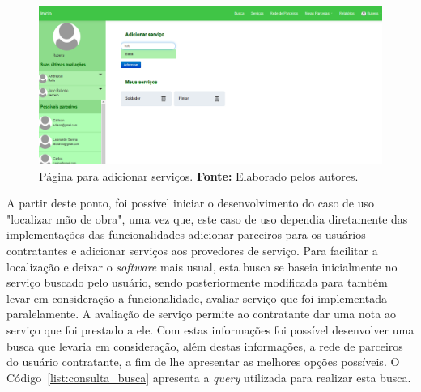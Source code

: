 \newpage
\begin{figure}[h!]
	\centerline{\includegraphics[scale=0.3]{./imagens/adcionar-servico.png}}
	\caption[Página para adicionar serviços.]
	{Página para adicionar serviços. \textbf{Fonte:} Elaborado pelos autores.}
	\label{fig:adicionar_servicos}
\end{figure}


\par A partir deste ponto, foi possível iniciar o desenvolvimento do caso de uso "localizar mão de obra", uma vez que, este caso de uso dependia diretamente das implementações das funcionalidades adicionar parceiros para os usuários contratantes e adicionar serviços aos provedores de serviço. Para facilitar a localização e deixar o \textit{software} mais usual, esta busca se baseia inicialmente no serviço buscado pelo usuário, sendo posteriormente modificada para também levar em consideração a funcionalidade, avaliar serviço que foi implementada paralelamente. A avaliação de serviço permite ao contratante dar uma nota ao serviço que foi prestado a ele. Com estas informações foi possível desenvolver uma busca que levaria em consideração, além destas informações, a rede de parceiros do usuário contratante, a fim de lhe apresentar as melhores opções possíveis. O Código~\ref{list:consulta_busca} apresenta a \textit{query} utilizada para realizar esta busca.


